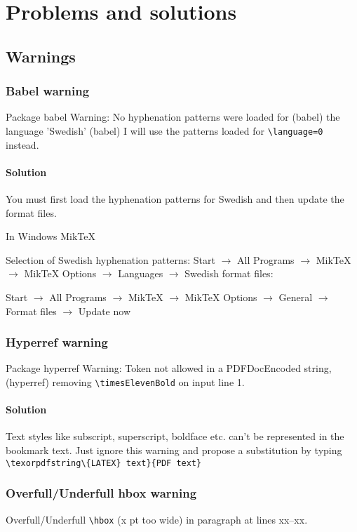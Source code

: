\chapter{Problems and solutions}
\section{Warnings}

\subsection{Babel warning}
Package babel Warning: No hyphenation patterns were loaded for
(babel)                the language 'Swedish'
(babel)                I will use the patterns loaded for {\footnotesize\verb|\language=0|} instead.

\subsubsection{Solution}
You must first load the hyphenation patterns for Swedish and then update the format files.
 
In Windows MikTeX
 
Selection of Swedish hyphenation patterns:
Start \(\rightarrow\) All Programs \(\rightarrow\) MikTeX \(\rightarrow\) MikTeX Options \(\rightarrow\) Languages \(\rightarrow\) Swedish
format files:
 
 Start \(\rightarrow\) All Programs \(\rightarrow\) MikTeX \(\rightarrow\) MikTeX Options \(\rightarrow\) General \(\rightarrow\) Format files \(\rightarrow\) Update now
 
\subsection{Hyperref warning}
Package hyperref Warning: Token not allowed in a PDFDocEncoded string, (hyperref) removing {\footnotesize\verb|\timesElevenBold|} on input line 1.

\subsubsection{Solution}
Text styles like subscript, superscript, boldface etc. can't be represented in the bookmark text. Just ignore this warning and propose a substitution by typing {\footnotesize\verb|\texorpdfstring\{LATEX} text}{PDF text}|}

\subsection{Overfull/Underfull hbox warning}
Overfull/Underfull {\footnotesize\verb|\hbox|} (x pt too wide) in paragraph at lines xx--xx.

